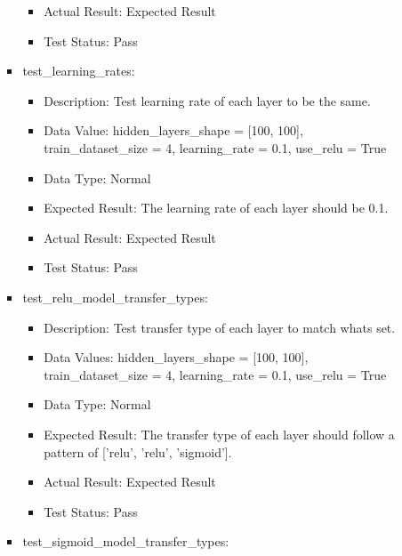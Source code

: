 \documentclass[./project-report/src/latex/project-report.tex]{subfiles}
\begin{document}
\begin{itemize}
\begin{itemize}
\begin{itemize}
\begin{itemize}
						\item Actual Result: Expected Result
						\item Test Status: Pass
					\end{itemize}
					\item test\_learning\_rates:
					\begin{itemize}
						\item Description: Test learning rate of each layer to be the same.
						\item Data Value: \newline
							hidden\_layers\_shape = [100, 100], \newline
                         	train\_dataset\_size = 4, \newline
                         	learning\_rate = 0.1, \newline
                         	use\_relu = True
						\item Data Type: Normal
						\item Expected Result: The learning rate of each layer should be 0.1.
						\item Actual Result: Expected Result
						\item Test Status: Pass
					\end{itemize}
					\item test\_relu\_model\_transfer\_types:
					\begin{itemize}
						\item Description: Test transfer type of each layer to match whats set.
						\item Data Values: \newline
							hidden\_layers\_shape = [100, 100], \newline
                        	train\_dataset\_size = 4, \newline
                            learning\_rate = 0.1, \newline
                            use\_relu = True
						\item Data Type: Normal
						\item Expected Result: The transfer type of each layer should follow a pattern of ['relu', 'relu', 'sigmoid'].
						\item Actual Result: Expected Result
						\item Test Status: Pass
					\end{itemize}
					\item test\_sigmoid\_model\_transfer\_types:
					\begin{itemize}

\end{itemize}
\end{itemize}
\end{itemize}
\end{itemize}
\end{document}
